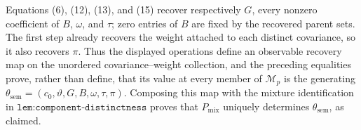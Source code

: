 Equations (6), (12), (13), and (15) recover respectively \(G\), every
nonzero coefficient of \(B\), \(\omega\), and \(\tau\); zero entries of
\(B\) are fixed by the recovered parent sets.  The first step already
recovers the weight attached to each distinct covariance, so it also recovers
\(\pi\).  Thus the displayed operations define an observable recovery map on
the unordered covariance--weight collection, and the preceding equalities
prove, rather than define, that its value at every member of \(\mathcal M_p\)
is the generating
\(\theta_{\mathrm{sem}}=(c_0,\vartheta,G,B,\omega,\tau,\pi)\).  Composing
this map with the mixture identification in
\(\texttt{lem:component-distinctness}\) proves that \(P_{\mathrm{mix}}\)
uniquely determines \(\theta_{\mathrm{sem}}\), as claimed.
